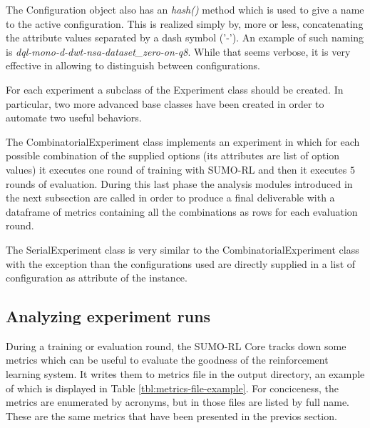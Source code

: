 The Configuration object also has an \textit{hash()} method which is used to give a name to the active configuration.
This is realized simply by, more or less, concatenating the attribute values separated by a dash symbol ('-').
An example of such naming is \textit{dql-mono-d-dwt-nsa-dataset\_zero-on-q8}.
While that seems verbose, it is very effective in allowing to distinguish between configurations.

For each experiment a subclass of the Experiment class should be created.
In particular, two more advanced base classes have been created in order to automate two useful behaviors.

The CombinatorialExperiment class implements an experiment in which for each possible combination of the supplied options (its attributes are list of option values) it executes one round of training with SUMO-RL and then it executes $5$ rounds of evaluation.
During this last phase the analysis modules introduced in the next subsection are called in order to produce a final deliverable with a dataframe of metrics containing all the combinations as rows for each evaluation round.

The SerialExperiment class is very similar to the CombinatorialExperiment class with the exception than the configurations used are directly supplied in a list of configuration as attribute of the instance.


\subsection{Analyzing experiment runs}

During a training or evaluation round, the SUMO-RL Core tracks down some metrics which can be useful to evaluate the goodness of the reinforcement learning system.
It writes them to metrics file in the output directory, an example of which is displayed in Table \ref{tbl:metrics-file-example}.
For conciceness, the metrics are enumerated by acronyms, but in those files are listed by full name.
These are the same metrics that have been presented in the previos section.

